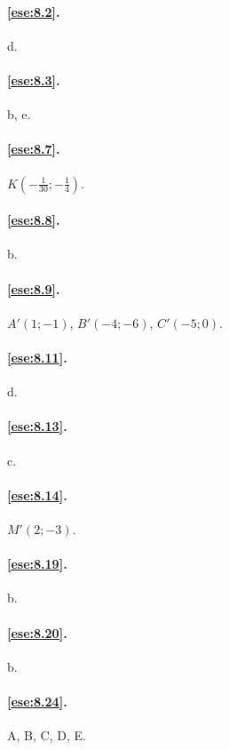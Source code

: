 \begingroup
\hypersetup{linkcolor=black}

\paragraph{\ref{ese:8.2}.}
d.

\paragraph{\ref{ese:8.3}.}
b, e.

\paragraph{\ref{ese:8.7}.}
\(K\left(-\frac{1}{30};-\frac{1}{4}\right)\).

\paragraph{\ref{ese:8.8}.}
b.

\paragraph{\ref{ese:8.9}.}
\(A'(1;-1)\), \(B'(-4;-6)\), \(C'(-5;0)\).

\paragraph{\ref{ese:8.11}.}
d.

\paragraph{\ref{ese:8.13}.}
c.

\paragraph{\ref{ese:8.14}.}
\(M'(2;-3)\).

\paragraph{\ref{ese:8.19}.}
b.

\paragraph{\ref{ese:8.20}.}
b.

\paragraph{\ref{ese:8.24}.}
A, B, C, D, E.

